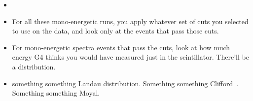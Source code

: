 \begin{itemize}
		\item {}
		\item For all these mono-energetic runs, you apply whatever set of cuts you selected to use on the data, and look only at the events that pass those cuts.  
		\item For mono-energetic spectra events that pass the cuts, look at how much energy G4 thinks you would have measured just in the scintillator.  There'll be a distribution.  
		\item something something Landau distribution.  Something something Clifford~\cite{clifford}.  Something something Moyal.
\end{itemize}



